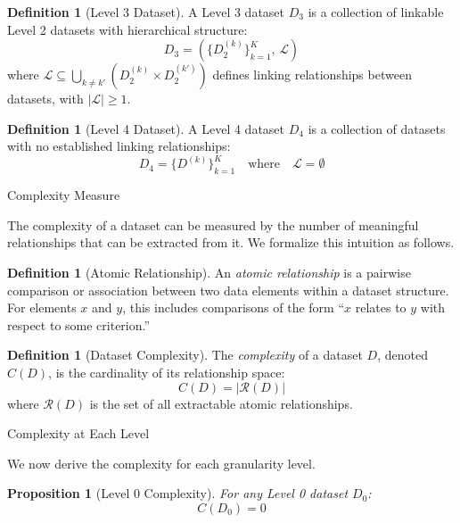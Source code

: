 \documentclass[]{hdsr}
\makeatletter
\def\subsection{\@startsection{subsection}{2}%
  \z@{.5\linespacing\@plus.7\linespacing}{.5\linespacing}%
  {\normalfont\bfseries}}
\theoremstyle{plain}      %
\newtheorem{proposition}[theorem]{Proposition}
\theoremstyle{definition} %
\newtheorem{definition}[theorem]{Definition}
\theoremstyle{remark}     %
\makeatother
\begin{document}
\begin{definition}[Level 3 Dataset]
\label{def:level3}
A Level 3 dataset $D_3$ is a collection of linkable Level 2 datasets with hierarchical structure:
\[
D_3 = \left(\{D_2^{(k)}\}_{k=1}^K, \, \mathcal{L}\right)
\]
where $\mathcal{L} \subseteq \bigcup_{k \neq k'} (D_2^{(k)} \times D_2^{(k')})$ defines linking relationships between datasets, with $|\mathcal{L}| \geq 1$.
\end{definition}

\begin{definition}[Level 4 Dataset]
\label{def:level4}
A Level 4 dataset $D_4$ is a collection of datasets with no established linking relationships:
\[
D_4 = \{D^{(k)}\}_{k=1}^K \quad \text{where} \quad \mathcal{L} = \emptyset
\]
\end{definition}

\subsection{Complexity Measure}

The complexity of a dataset can be measured by the number of meaningful relationships that can be extracted from it. We formalize this intuition as follows.

\begin{definition}[Atomic Relationship]
\label{def:relationship}
An \emph{atomic relationship} is a pairwise comparison or association between two data elements within a dataset structure. For elements $x$ and $y$, this includes comparisons of the form ``$x$ relates to $y$ with respect to some criterion.''
\end{definition}

\begin{definition}[Dataset Complexity]
\label{def:complexity}
The \emph{complexity} of a dataset $D$, denoted $C(D)$, is the cardinality of its relationship space:
\[
C(D) = |\mathcal{R}(D)|
\]
where $\mathcal{R}(D)$ is the set of all extractable atomic relationships.
\end{definition}

\subsection{Complexity at Each Level}

We now derive the complexity for each granularity level.

\begin{proposition}[Level 0 Complexity]
\label{prop:level0}
For any Level 0 dataset $D_0$:
\[
C(D_0) = 0
\]
\end{proposition}
\end{document}
